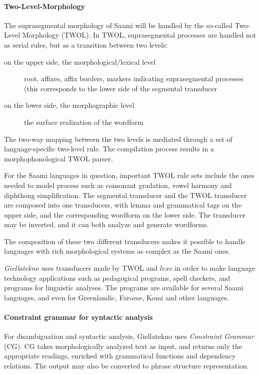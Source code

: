 \documentclass[a4paper,12pt]{article}
\begin{document}
\paragraph{Two-Level-Morphology}
The suprasegmental morphology of Saami will be handled by the so-called Two-Level Morphology (TWOL). In TWOL, suprasegmental processes are handled not as serial rules, but as a transition between two levels:
\begin{description}
\item[on the upper side, the morphological/lexical level] root, affixes, affix borders, markers indicating suprasegmental processes (this corresponds to the lower side of the segmental transducer
\item[on the lower side, the morphographic level] the surface realization of the wordform
\end{description}
The two-way mapping between the two levels is mediated through a set of language-specific two-level rule. The compilation process results in a morphophonological TWOL parser.

For the Saami languages in question, important TWOL rule sets include the ones needed to model process such as consonant gradation, vowel harmony and diphthong simplification. The segmental transducer and the TWOL transducer are composed into one transducers, with lemma and grammatical tags on the upper side, and the corresponding wordform on the lower side. The transducer may be inverted, and it can both analyze and generate wordforms.

The composition of these two different transducers makes it possible to handle languages with rich morphological systems as complex as the Saami ones. 

\textit{Giellatekno} uses transducers made by TWOL and $lexc$ %
in order to make language technology applications such as pedagogical programs, spell checkers, and programs for linguistic analyses. The programs are available for several Saami languages, and even for Greenlandic, Faroese, Komi and other languages.

\paragraph{Constraint grammar for syntactic analysis}
For disambiguation and syntactic analysis, Giellatekno uses \textit{Constraint Grammar} (CG). CG takes morphologically analyzed text as input, and returns only the appropriate readings, enriched with grammatical functions and dependency relations. The output may also be converted to phrase structure representation.
\end{document}
